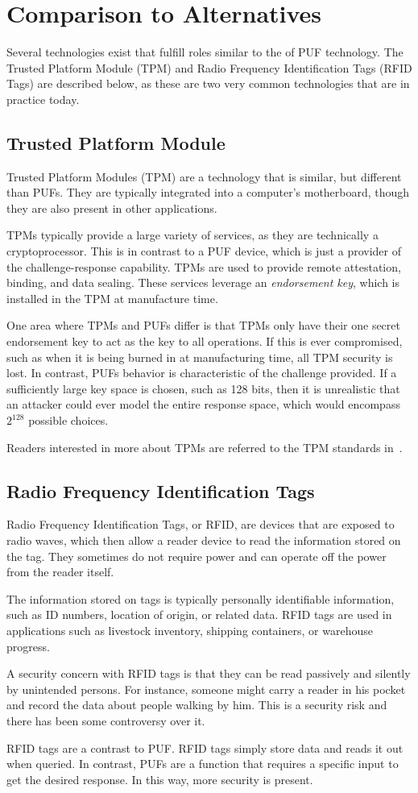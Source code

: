 \section{Comparison to Alternatives}
Several technologies exist that fulfill roles similar to the of PUF technology. The Trusted Platform Module (TPM)
and Radio Frequency Identification Tags (RFID Tags) are described below, as these are two very common
technologies that are in practice today.

\subsection{Trusted Platform Module}
Trusted Platform Modules (TPM) are a technology that is similar, but different than PUFs. They are
typically integrated into a computer's motherboard, though they are also present in other applications.

TPMs typically provide a large variety of services, as they are technically a cryptoprocessor. This is in
contrast to a PUF device, which is just a provider of the challenge-response capability. TPMs are used
to provide remote attestation, binding, and data sealing. These services leverage an \textit{endorsement 
key}, which is installed in the TPM at manufacture time.

One area where TPMs and PUFs differ is that TPMs only have their one secret endorsement key to act
as the key to all operations. If this is ever compromised, such as when it is being burned in at
manufacturing time, all TPM security is lost. In contrast, PUFs behavior is characteristic of the challenge
provided. If a sufficiently large key space is chosen, such as 128 bits, then it is unrealistic that an
attacker could ever model the entire response space, which would encompass $2^{128}$ possible choices.

Readers interested in more about TPMs are referred to the TPM standards in~\cite{tpm}.

\subsection{Radio Frequency Identification Tags}
Radio Frequency Identification Tags, or RFID, are devices that are exposed to radio waves, which then
allow a reader device to read the information stored on the tag. They sometimes do not require power
and can operate off the power from the reader itself.

The information stored on tags is typically personally identifiable information, such as ID numbers,
location of origin, or related data. RFID tags are used in applications such as livestock inventory,
shipping containers, or warehouse progress.

A security concern with RFID tags is that they can be read passively and silently by unintended persons.
For instance, someone might carry a reader in his pocket and record the data about people walking
by him. This is a security risk and there has been some controversy over it.

RFID tags are a contrast to PUF. RFID tags simply store data and reads it out when queried. In contrast,
PUFs are a function that requires a specific input to get the desired response. In this way, more security
is present.
